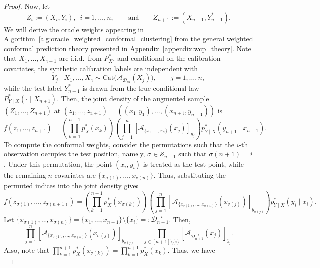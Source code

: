 \documentclass[11pt,letterpaper]{article}
\theoremstyle{definition}
\newcommand{\cD}{\mathcal{D}}
\begin{document}
\begin{proof}
Now, let
\[
    Z_i := (X_i,Y_i), \; \ i=1,\ldots,n,
    \qquad\text{and}\qquad
    Z_{n+1} := (X_{n+1}, Y_{n + 1}^\ast).
\]
We will derive the oracle weights appearing in Algorithm~\ref{alg:oracle_weighted_conformal_clustering} from the general weighted conformal prediction theory presented in Appendix~\ref{appendix:wcp_theory}. Note that \(X_1,\ldots,X_{n+1}\) are i.i.d.\ from \(P_X^\ast\), and conditional on the calibration covariates, the synthetic calibration labels are independent with
\[
    Y_j \mid X_1,\ldots,X_n \sim \mathrm{Cat}\bigl(\mathcal A_{\cD_{ca}}(X_j)\bigr),
    \qquad j=1,\ldots,n,
\]
while the test label $Y_{n + 1}^\ast$ is drawn from the true conditional law \(P_{Y\mid X}^\ast(\cdot \mid X_{n+1})\). Then, the joint density of the augmented sample $(Z_1,\ldots,Z_{n+1})$ at $(z_1, \ldots, z_{n + 1}) = ((x_1, y_1), \ldots, (x_{n + 1}, y_{n + 1}))$
is
\begin{equation}
    \label{eq:joint_density_original}
    f(z_1,\ldots,z_{n+1})
    =
    \left(\prod_{k=1}^{n+1} p_X^\ast(x_k)\right)
    \left(\prod_{j=1}^n \left[\mathcal A_{\{x_1, \ldots, x_n\}}(x_j)\right]_{y_j}\right)
    p_{Y\mid X}^\ast(y_{n + 1} \mid x_{n+1}).
\end{equation}
To compute the conformal weights, consider the permutations such that the \(i\)-th observation occupies the test position, namely, \(\sigma \in \mathcal S_{n+1}\) such that $\sigma(n+1)=i$. Under this permutation, the point \((x_i,y_i)\) is treated as the test point, while the remaining \(n\) covariates are $\{x_{\sigma(1)},\ldots,x_{\sigma(n)}\}$. Thus, substituting the permuted indices into the joint density gives
\begin{equation*}
    f(z_{\sigma(1)},\ldots,z_{\sigma(n+1)})
    =
    \left(\prod_{k=1}^{n+1} p_X^\ast(x_{\sigma(k)})\right)
    \left(\prod_{j=1}^n \left[\mathcal A_{\{x_{\sigma(1)},\ldots,x_{\sigma(n)}\}}(x_{\sigma(j)})\right]_{y_{\sigma(j)}}\right)
    p_{Y\mid X}^\ast(y_i \mid x_i).
\end{equation*}
Let \(\{x_{\sigma(1)},\ldots,x_{\sigma(n)}\} = \{x_1, \ldots, x_{n + 1}\} \setminus \{x_i\} =: \cD_{n+1}^{-i}\). Then,
\[
    \prod_{j=1}^n \left[\mathcal A_{\{x_{\sigma(1)},\ldots,x_{\sigma(n)}\}}(x_{\sigma(j)})\right]_{y_{\sigma(j)}}
    =
    \prod_{j \in [n + 1] \setminus \{i\}} \left[\mathcal A_{\cD_{n+1}^{-i}}(x_j)\right]_{y_j}.
\]
Also, note that $\prod_{k=1}^{n+1} p_X^\ast(x_{\sigma(k)})=\prod_{k=1}^{n+1} p_X^\ast(x_k)$. Thus, we have
\begin{equation}
    \label{eq:joint_density_permuted_simplified}

\end{equation}
\end{proof}
\end{document}

